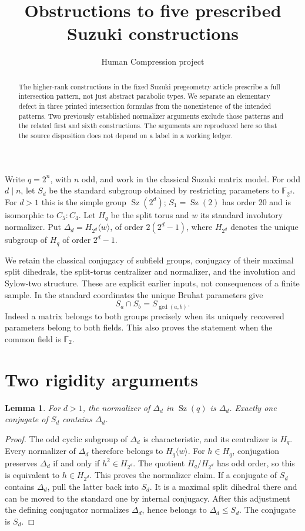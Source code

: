 \documentclass[11pt,a4paper]{article}
\title{Obstructions to five prescribed Suzuki constructions}
\author{Human Compression project}\date{}
\newtheorem{lemma}{Lemma}\newtheorem{theorem}[lemma]{Theorem}
\newcommand{\Sz}{\operatorname{Sz}}
\newcommand{\gen}[1]{\langle#1\rangle}
\begin{document}
\maketitle
\begin{abstract}
The higher-rank constructions in the fixed Suzuki pregeometry article
prescribe a full intersection pattern, not just abstract parabolic types.
We separate an elementary defect in three printed intersection formulas
from the nonexistence of the intended patterns. Two previously established
normalizer arguments exclude those patterns and the related first and
sixth constructions. The arguments are reproduced here so that the source
disposition does not depend on a label in a working ledger.
\end{abstract}

Write $q=2^n$, with $n$ odd, and work in the classical Suzuki matrix model.
For odd $d\mid n$, let $S_d$ be the standard subgroup obtained by restricting
parameters to $\mathbb F_{2^d}$. For $d>1$ this is the simple group
$\Sz(2^d)$; $S_1=\Sz(2)$ has order 20 and is isomorphic to $C_5:C_4$.
Let $H_q$ be the split torus and $w$ its standard involutory normalizer.
Put $\Delta_d=H_{2^d}\gen w$, of order $2(2^d-1)$, where $H_{2^d}$ denotes
the unique subgroup of $H_q$ of order $2^d-1$.

We retain the classical conjugacy of subfield groups, conjugacy of their
maximal split dihedrals, the split-torus centralizer and normalizer, and
the involution and Sylow-two structure. These are explicit earlier inputs,
not consequences of a finite sample. In the standard coordinates the
unique Bruhat parameters give
\begin{equation}\label{field}
 S_a\cap S_b=S_{\gcd(a,b)}.
\end{equation}
Indeed a matrix belongs to both groups precisely when its uniquely
recovered parameters belong to both fields. This also proves the statement
when the common field is $\mathbb F_2$.

\section{Two rigidity arguments}
\begin{lemma}\label{split}
For $d>1$, the normalizer of $\Delta_d$ in $\Sz(q)$ is $\Delta_d$.
Exactly one conjugate of $S_d$ contains $\Delta_d$.
\end{lemma}
\begin{proof}
The odd cyclic subgroup of $\Delta_d$ is characteristic, and its centralizer
is $H_q$. Every normalizer of $\Delta_d$ therefore belongs to
$H_q\gen w$. For $h\in H_q$, conjugation preserves $\Delta_d$ if and only
if $h^2\in H_{2^d}$. The quotient $H_q/H_{2^d}$ has odd order,
so this is equivalent to $h\in H_{2^d}$. This proves the normalizer claim.
If a conjugate of $S_d$ contains $\Delta_d$, pull the latter back into $S_d$.
It is a maximal split dihedral there and can be moved to the standard
one by internal conjugacy. After this adjustment the defining conjugator
normalizes $\Delta_d$, hence belongs to $\Delta_d\leq S_d$. The conjugate is $S_d$.
\end{proof}
\end{document}
